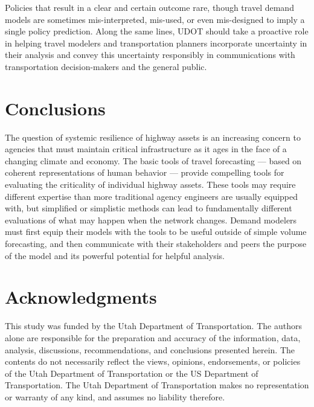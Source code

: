 \documentclass[
  letterpaper,
]{trb}
\begin{document}
Policies that result in a clear and certain outcome rare, though travel
demand models are sometimes mis-interpreted, mis-used, or even
mis-designed to imply a single policy prediction. Along the same lines,
UDOT should take a proactive role in helping travel modelers and
transportation planners incorporate uncertainty in their analysis and
convey this uncertainty responsibly in communications with
transportation decision-makers and the general public.


\hypertarget{conclusions}{%
\section{Conclusions}\label{conclusions}}

The question of systemic resilience of highway assets is an increasing
concern to agencies that must maintain critical infrastructure as it
ages in the face of a changing climate and economy. The basic tools of
travel forecasting --- based on coherent representations of human
behavior --- provide compelling tools for evaluating the criticality of
individual highway assets. These tools may require different expertise
than more traditional agency engineers are usually equipped with, but
simplified or simplistic methods can lead to fundamentally different
evaluations of what may happen when the network changes. Demand modelers
must first equip their models with the tools to be useful outside of
simple volume forecasting, and then communicate with their stakeholders
and peers the purpose of the model and its powerful potential for
helpful analysis.


\hypertarget{acknowledgments}{%
\section*{Acknowledgments}\label{acknowledgments}}


This study was funded by the Utah Department of Transportation. The
authors alone are responsible for the preparation and accuracy of the
information, data, analysis, discussions, recommendations, and
conclusions presented herein. The contents do not necessarily reflect
the views, opinions, endorsements, or policies of the Utah Department of
Transportation or the US Department of Transportation. The Utah
Department of Transportation makes no representation or warranty of any
kind, and assumes no liability therefore.
\end{document}
